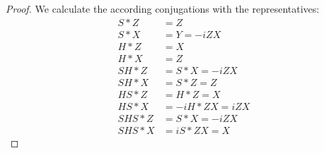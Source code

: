 \documentclass[a4paper,english]{scrartcl}
\begin{document}
\begin{proof}
We calculate the according conjugations with the representatives:
\begin{align}
  S*Z &= Z\\
  S*X &= Y = -iZX\\
  H*Z &= X\\
  H*X &= Z\\
  SH*Z &= S*X = -iZX\\
  SH*X &= S*Z = Z\\
  HS*Z &= H*Z = X\\
  HS*X &= -iH*ZX = iZX\\
  SHS*Z &= S*X = -iZX\\
  SHS*X &= iS*ZX = X
\end{align}
\end{proof}
\end{document}
